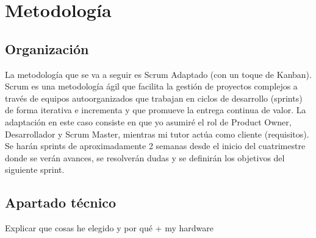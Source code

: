 
\chapter{Metodología}
\label{metodologia}

\section{Organización}

La metodología que se va a seguir es Scrum Adaptado (con un toque de Kanban).
Scrum es una metodología ágil que facilita la gestión de proyectos complejos a través de equipos autoorganizados que trabajan en ciclos de desarrollo (sprints) de forma iterativa e incrementa y que promueve la entrega continua de valor.
La adaptación en este caso consiste en que yo asumiré el rol de Product Owner, Desarrollador y Scrum Master, mientras mi tutor actúa como cliente (requisitos).
Se harán sprints de aproximadamente 2 semanas desde el inicio del cuatrimestre donde se verán avances, se resolverán dudas y se definirán los objetivos del siguiente sprint.

\section{Apartado técnico}

Explicar que cosas he elegido y por qué + my hardware